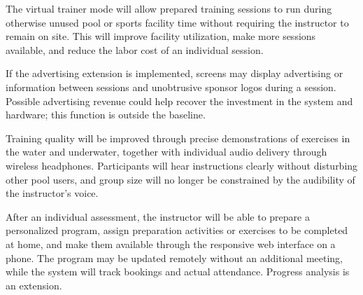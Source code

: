 \documentclass[a4paper,11pt]{article}
\begin{document}
The virtual trainer mode will allow prepared training sessions to run during otherwise unused pool or sports facility time without requiring the instructor to remain on site. This will improve facility utilization, make more sessions available, and reduce the labor cost of an individual session.

If the advertising extension is implemented, screens may display advertising or information between sessions and unobtrusive sponsor logos during a session. Possible advertising revenue could help recover the investment in the system and hardware; this function is outside the baseline.

Training quality will be improved through precise demonstrations of exercises in the water and underwater, together with individual audio delivery through wireless headphones. Participants will hear instructions clearly without disturbing other pool users, and group size will no longer be constrained by the audibility of the instructor's voice.

After an individual assessment, the instructor will be able to prepare a personalized program, assign preparation activities or exercises to be completed at home, and make them available through the responsive web interface on a phone. The program may be updated remotely without an additional meeting, while the system will track bookings and actual attendance. Progress analysis is an extension.
\end{document}
